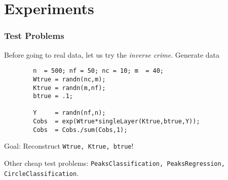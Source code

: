 \documentclass[12pt,fleqn,handout]{beamer}
\begin{document}
\section{Experiments}

\begin{frame}[fragile]
	\frametitle{Test Problems}
	
	Before going to real data, let us try the \emph{inverse crime}. Generate data
	\begin{verbatim}
		n  = 500; nf = 50; nc = 10; m  = 40;
		Wtrue = randn(nc,m);
		Ktrue = randn(m,nf);
		btrue = .1;

		Y     = randn(nf,n);
		Cobs  = exp(Wtrue*singleLayer(Ktrue,btrue,Y));
		Cobs  = Cobs./sum(Cobs,1);		
	\end{verbatim}
	
	\begin{center}
	Goal: Reconstruct \texttt{Wtrue, Ktrue, btrue}!  
	\end{center}
	
	\bigskip
	
	Other cheap test problems: \texttt{PeaksClassification, PeaksRegression, CircleClassification}.
\end{frame}

%
%
%
\end{document}
